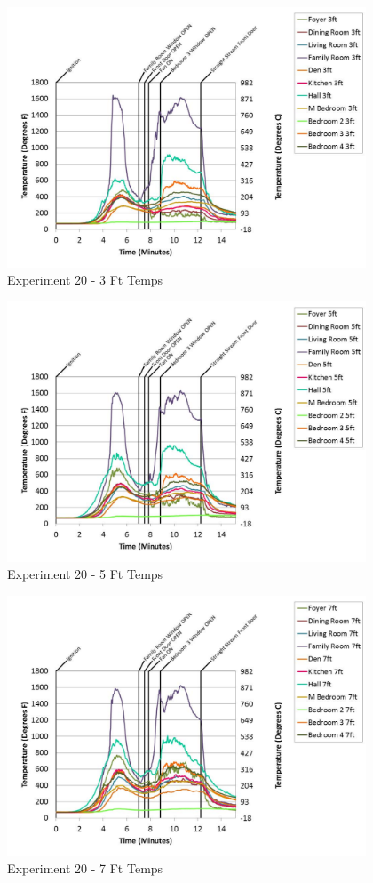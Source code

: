 \documentclass{article}
\begin{document}
\begin{appendices}
	\begin{figure}[h!]
		\centering
		\includegraphics[height=3.05in]{0_Images/Results_Charts/Exp_20_Charts/3FtTemps.pdf}
		\caption{Experiment 20 - 3 Ft Temps}
	\end{figure}
 
	\clearpage

	\begin{figure}[h!]
		\centering
		\includegraphics[height=3.05in]{0_Images/Results_Charts/Exp_20_Charts/5FtTemps.pdf}
		\caption{Experiment 20 - 5 Ft Temps}
	\end{figure}
 

	\begin{figure}[h!]
		\centering
		\includegraphics[height=3.05in]{0_Images/Results_Charts/Exp_20_Charts/7FtTemps.pdf}
		\caption{Experiment 20 - 7 Ft Temps}
	\end{figure}
 

\end{appendices}
\end{document}
